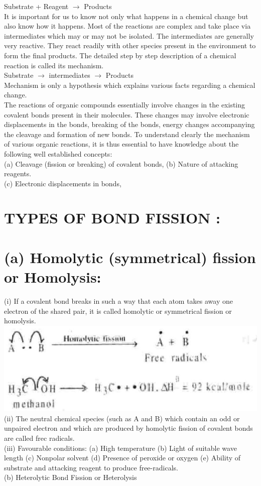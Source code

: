 \documentclass[10pt]{article}
\begin{document}
Substrate + Reagent $\rightarrow$ Products\\
It is important for us to know not only what happens in a chemical change but also know how it happens. Most of the reactions are complex and take place via intermediates which may or may not be isolated. The intermediates are generally very reactive. They react readily with other species present in the environment to form the final products. The detailed step by step description of a chemical reaction is called its mechanism.\\
Substrate $\longrightarrow$ intermediates $\longrightarrow$ Products\\
Mechanism is only a hypothesis which explains various facts regarding a chemical change.\\
The reactions of organic compounds essentially involve changes in the existing covalent bonds present in their molecules. These changes may involve electronic displacements in the bonds, breaking of the bonds, energy changes accompanying the cleavage and formation of new bonds. To understand clearly the mechanism of various organic reactions, it is thus essential to have knowledge about the following well established concepts:\\
(a) Cleavage (fission or breaking) of covalent bonds, (b) Nature of attacking reagents.\\
(c) Electronic displacements in bonds,

\section*{TYPES OF BOND FISSION :}
\section*{(a) Homolytic (symmetrical) fission or Homolysis:}
(i) If a covalent bond breaks in such a way that each atom takes away one electron of the shared pair, it is called homolytic or symmetrical fission or homolysis.\\
\includegraphics[max width=\textwidth, center]{2025_01_28_8470952b98110cec3aabg-065(1)}\\
(ii) The neutral chemical species (such as A and B) which contain an odd or unpaired electron and which are produced by homolytic fission of covalent bonds are called frec radicals.\\
(iii) Favourable conditions: (a) High temperature (b) Light of suitable wave length (c) Nonpolar solvent (d) Presence of peroxide or oxygen (e) Ability of substrate and attacking reagent to produce free-radicals.\\
(b) Heterolytic Bond Fission or Heterolysis
\end{document}
